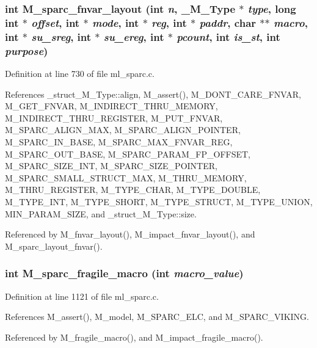 \subsubsection{\setlength{\rightskip}{0pt plus 5cm}int M\_\-sparc\_\-fnvar\_\-layout (int {\em n}, \bf{\_\-M\_\-Type} $\ast$ {\em type}, long int $\ast$ {\em offset}, int $\ast$ {\em mode}, int $\ast$ {\em reg}, int $\ast$ {\em paddr}, char $\ast$$\ast$ {\em macro}, int $\ast$ {\em su\_\-sreg}, int $\ast$ {\em su\_\-ereg}, int $\ast$ {\em pcount}, int {\em is\_\-st}, int {\em purpose})}\label{ml__sparc_8c_c4c1c1d7d55a98254d1b4a73f7548238}




Definition at line 730 of file ml\_\-sparc.c.

References \_\-struct\_\-M\_\-Type::align, M\_\-assert(), M\_\-DONT\_\-CARE\_\-FNVAR, M\_\-GET\_\-FNVAR, M\_\-INDIRECT\_\-THRU\_\-MEMORY, M\_\-INDIRECT\_\-THRU\_\-REGISTER, M\_\-PUT\_\-FNVAR, M\_\-SPARC\_\-ALIGN\_\-MAX, M\_\-SPARC\_\-ALIGN\_\-POINTER, M\_\-SPARC\_\-IN\_\-BASE, M\_\-SPARC\_\-MAX\_\-FNVAR\_\-REG, M\_\-SPARC\_\-OUT\_\-BASE, M\_\-SPARC\_\-PARAM\_\-FP\_\-OFFSET, M\_\-SPARC\_\-SIZE\_\-INT, M\_\-SPARC\_\-SIZE\_\-POINTER, M\_\-SPARC\_\-SMALL\_\-STRUCT\_\-MAX, M\_\-THRU\_\-MEMORY, M\_\-THRU\_\-REGISTER, M\_\-TYPE\_\-CHAR, M\_\-TYPE\_\-DOUBLE, M\_\-TYPE\_\-INT, M\_\-TYPE\_\-SHORT, M\_\-TYPE\_\-STRUCT, M\_\-TYPE\_\-UNION, MIN\_\-PARAM\_\-SIZE, and \_\-struct\_\-M\_\-Type::size.

Referenced by M\_\-fnvar\_\-layout(), M\_\-impact\_\-fnvar\_\-layout(), and M\_\-sparc\_\-layout\_\-fnvar().
\subsubsection{\setlength{\rightskip}{0pt plus 5cm}int M\_\-sparc\_\-fragile\_\-macro (int {\em macro\_\-value})}\label{ml__sparc_8c_76db0d78c52a3d7d97e43d368b8f839c}




Definition at line 1121 of file ml\_\-sparc.c.

References M\_\-assert(), M\_\-model, M\_\-SPARC\_\-ELC, and M\_\-SPARC\_\-VIKING.

Referenced by M\_\-fragile\_\-macro(), and M\_\-impact\_\-fragile\_\-macro().
